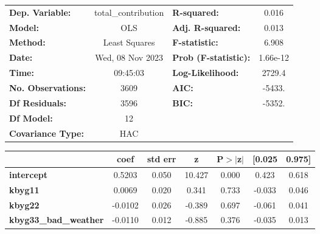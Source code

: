 \begin{center}
\begin{tabular}{lclc}
\toprule
\textbf{Dep. Variable:}                      & total\_contribution & \textbf{  R-squared:         } &     0.016   \\
\textbf{Model:}                              &         OLS         & \textbf{  Adj. R-squared:    } &     0.013   \\
\textbf{Method:}                             &    Least Squares    & \textbf{  F-statistic:       } &     6.908   \\
\textbf{Date:}                               &   Wed, 08 Nov 2023  & \textbf{  Prob (F-statistic):} &  1.66e-12   \\
\textbf{Time:}                               &       09:45:03      & \textbf{  Log-Likelihood:    } &    2729.4   \\
\textbf{No. Observations:}                   &          3609       & \textbf{  AIC:               } &    -5433.   \\
\textbf{Df Residuals:}                       &          3596       & \textbf{  BIC:               } &    -5352.   \\
\textbf{Df Model:}                           &            12       & \textbf{                     } &             \\
\textbf{Covariance Type:}                    &         HAC         & \textbf{                     } &             \\
\bottomrule
\end{tabular}
\begin{tabular}{lcccccc}
                                             & \textbf{coef} & \textbf{std err} & \textbf{z} & \textbf{P$> |$z$|$} & \textbf{[0.025} & \textbf{0.975]}  \\
\midrule
\textbf{intercept}                           &       0.5203  &        0.050     &    10.427  &         0.000        &        0.423    &        0.618     \\
\textbf{kbyg11}                              &       0.0069  &        0.020     &     0.341  &         0.733        &       -0.033    &        0.046     \\
\textbf{kbyg22}                              &      -0.0102  &        0.026     &    -0.389  &         0.697        &       -0.061    &        0.041     \\
\textbf{kbyg33\_bad\_weather}                &      -0.0110  &        0.012     &    -0.885  &         0.376        &       -0.035    &        0.013     \\

\end{tabular}
\end{center}
